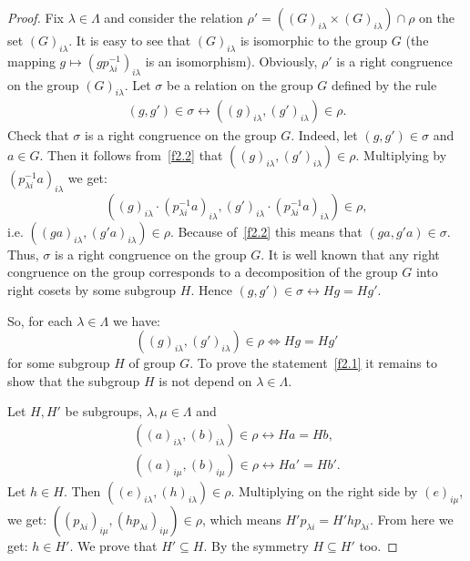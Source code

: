 \documentclass{birkau}
\numberwithin{equation}{section}
\theoremstyle{plain}
\theoremstyle{definition}
\begin{document}
	\begin{proof}
	    Fix $\lambda \in \Lambda$ and consider the relation $\rho' = ((G)_{i \lambda} \times (G)_{i \lambda}) \cap \rho$ on the set $(G)_{i \lambda}$. It is easy to see that $(G)_{i \lambda}$ is isomorphic to the group $G$ (the mapping $g \mapsto (g p_{\lambda i}^{-1})_{i \lambda}$ is an isomorphism). Obviously, $\rho'$ is a right congruence on the group $(G)_{i \lambda}$. Let $\sigma$ be a relation on the group $G$ defined by the rule
		\begin{gather}
			(g,g') \in \sigma \leftrightarrow ((g)_{i \lambda},(g')_{i \lambda}) \in \rho. \label{f2.2}
		\end{gather}
		Check that $\sigma$ is a right congruence on the group $G$. Indeed, let $(g,g') \in \sigma$ and $a \in G$. Then it follows from~\eqref{f2.2} that $((g)_{i \lambda},(g')_{i \lambda}) \in \rho$. Multiplying by $(p_{\lambda i}^{-1} a)_{i \lambda}$ we get: $$ ((g)_{i \lambda} \cdot (p_{\lambda i}^{-1} a)_{i \lambda},(g')_{i \lambda} \cdot (p_{\lambda i}^{-1} a)_{i \lambda}) \in \rho, $$ i.e. $ ((g a)_{i \lambda},(g' a)_{i \lambda}) \in \rho $. Because of~\eqref{f2.2} this means that $(ga,g'a) \in \sigma$. Thus, $\sigma$ is a right congruence on the group $G$. It is well known that any right congruence on the group corresponds to a decomposition of the group $G$ into right cosets by some subgroup $H$. Hence $(g,g') \in \sigma \leftrightarrow Hg = Hg'$.
		
		So, for each $\lambda \in \Lambda$ we have: $$ ((g)_{i \lambda},(g')_{i \lambda}) \in \rho \Leftrightarrow Hg = Hg' $$ for some subgroup $H$ of group $G$. To prove the statement~\eqref{f2.1} it remains to show that the subgroup $H$ is not depend on $\lambda \in \Lambda$.
		
		\par Let $H,H'$ be subgroups, $\lambda,\mu \in \Lambda$ and
		\begin{gather*}
			((a)_{i \lambda},(b)_{i \lambda}) \in \rho \leftrightarrow Ha = Hb, \\
			((a)_{i \mu},(b)_{i \mu}) \in \rho \leftrightarrow Ha' = Hb'.
		\end{gather*}
		Let $h \in H$. Then $((e)_{i \lambda},(h)_{i \lambda}) \in \rho$. Multiplying on the right side by $(e)_{i \mu}$, we get: $((p_{\lambda i})_{i \mu}, (h p_{\lambda i})_{i \mu}) \in \rho$, which means $H' p_{\lambda i} = H' h p_{\lambda i}$. From here we get: $h \in H'$. We prove that $H' \subseteq H$. By the symmetry $H \subseteq H'$ too.
	\end{proof}
	
\end{document}
